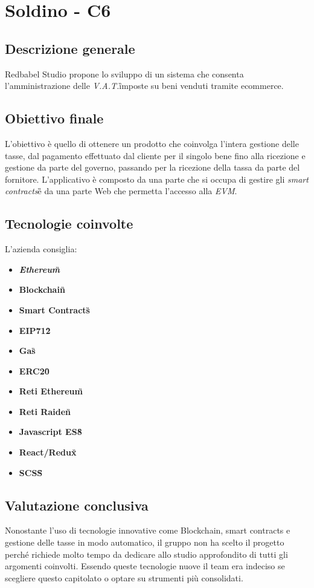 \section{Soldino - C6} \label{c6}
    \subsection{Descrizione generale}
    Redbabel Studio propone lo sviluppo di un sistema che consenta l'amministrazione delle \textit{V.A.T.}\G imposte su beni venduti tramite ecommerce.
    \subsection{Obiettivo finale}
    
    L'obiettivo è quello di ottenere un prodotto che coinvolga l'intera gestione delle tasse, dal pagamento effettuato dal cliente per il singolo bene fino alla ricezione e gestione da parte del governo, passando per la ricezione della tassa da parte del fornitore.
    L'applicativo è composto da una parte che si occupa di gestire gli \textit{smart contracts}\G e da una parte Web che permetta l'accesso alla \textit{EVM}\GAlt.

    \subsection{Tecnologie coinvolte}
	L'azienda consiglia:
    	\begin{itemize}
        \item \textit{\textbf{Ethereum}}\G
		\item \textbf{Blockchain}\G
        \item \textbf{Smart Contracts}\G
		\item \textbf{EIP712}\G
		\item \textbf{Gas}\G
		\item \textbf{ERC20}\G
		\item \textbf{Reti Ethereum}\G
        \item \textbf{Reti Raiden}\G
        \item \textbf{Javascript ES8}\G
        \item \textbf{React/Redux}\G
        \item \textbf{SCSS}\G
	\end{itemize}
	
    \subsection{Valutazione conclusiva}
    Nonostante l'uso di tecnologie innovative come Blockchain, smart contracts e gestione delle tasse in modo automatico, il gruppo non ha scelto il progetto perché richiede molto tempo da dedicare allo studio approfondito di tutti gli argomenti coinvolti.
    Essendo queste tecnologie nuove il team era indeciso se scegliere questo capitolato o optare su strumenti più consolidati.